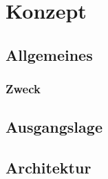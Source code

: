 \chapter{Konzept}
\section{Allgemeines}
\subsection{Zweck}

\section{Ausgangslage}

\section{Architektur}













